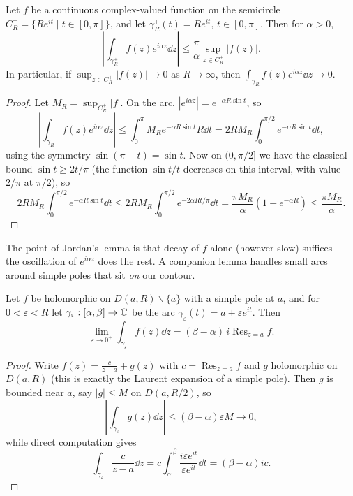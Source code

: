 \documentclass[a4paper]{scrartcl}
\begin{document}
\begin{lemma}
    Let $f$ be a continuous complex-valued function on the semicircle $C_R^+ = \{Re^{it} \mid t \in [0, \pi]\}$, and let $\gamma_R^+(t) = Re^{it}$, $t \in [0, \pi]$. Then for $\alpha > 0$,
    $$
    \left|\int_{\gamma_R^+} f(z)e^{i \alpha z} \dd z\right| \leq \frac{\pi}{\alpha} \sup_{z \in C_R^+} |f(z)|.
    $$
    In particular, if $\sup_{z \in C^+_R}|f(z)| \rightarrow 0$ as $R \rightarrow \infty$, then $\int_{\gamma_R^+} f(z)e^{i \alpha z} \dd z \rightarrow 0$.
\end{lemma}
\begin{proof}
    Let $M_R = \sup_{C_R^+}|f|$. On the arc, $|e^{i \alpha z}| = e^{-\alpha R \sin t}$, so
    $$
    \left|\int_{\gamma_R^+} f(z)e^{i \alpha z} \dd z\right| \leq \int_0^\pi M_R e^{-\alpha R \sin t} R \dd t = 2 R M_R \int_0^{\pi/2} e^{-\alpha R \sin t} \dd t,
    $$
    using the symmetry $\sin(\pi - t) = \sin t$. Now on $(0, \pi/2]$ we have the classical bound $\sin t \geq 2t/\pi$ (the function $\sin t / t$ decreases on this interval, with value $2/\pi$ at $\pi/2$), so
    \[
    2RM_R \int_0^{\pi/2} e^{-\alpha R \sin t} \dd t \leq 2RM_R\int_0^{\pi/2} e^{-2 \alpha R t/\pi} \dd t = \frac{\pi M_R}{\alpha}\left(1 - e^{-\alpha R}\right) \leq \frac{\pi M_R}{\alpha}.
    \]
\end{proof}

The point of Jordan's lemma is that decay of $f$ alone (however slow) suffices -- the oscillation of $e^{i \alpha z}$ does the rest. A companion lemma handles small arcs around simple poles that sit \emph{on} our contour.

\begin{lemma}
    Let $f$ be holomorphic on $D(a, R) \backslash \{a\}$ with a simple pole at $a$, and for $0 < \varepsilon < R$ let $\gamma_\varepsilon: [\alpha, \beta] \rightarrow \mathbb{C}$ be the arc $\gamma_\varepsilon(t) = a + \varepsilon e^{it}$. Then
    $$
    \lim_{\varepsilon \to 0^+} \int_{\gamma_\varepsilon} f(z) \dd z = (\beta - \alpha) \, i \operatorname{Res}_{z = a} f.
    $$
\end{lemma}
\begin{proof}
    Write $f(z) = \frac{c}{z - a} + g(z)$ with $c = \operatorname{Res}_{z = a}f$ and $g$ holomorphic on $D(a, R)$ (this is exactly the Laurent expansion of a simple pole). Then $g$ is bounded near $a$, say $|g| \leq M$ on $D(a, R/2)$, so
    $$
    \left|\int_{\gamma_\varepsilon} g(z) \dd z\right| \leq (\beta - \alpha)\varepsilon M \rightarrow 0,
    $$
    while direct computation gives
    \[
    \int_{\gamma_\varepsilon} \frac{c}{z - a} \dd z = c\int_\alpha^\beta \frac{i \varepsilon e^{it}}{\varepsilon e^{it}} \dd t = (\beta - \alpha) i c.
    \]
\end{proof}
\end{document}
